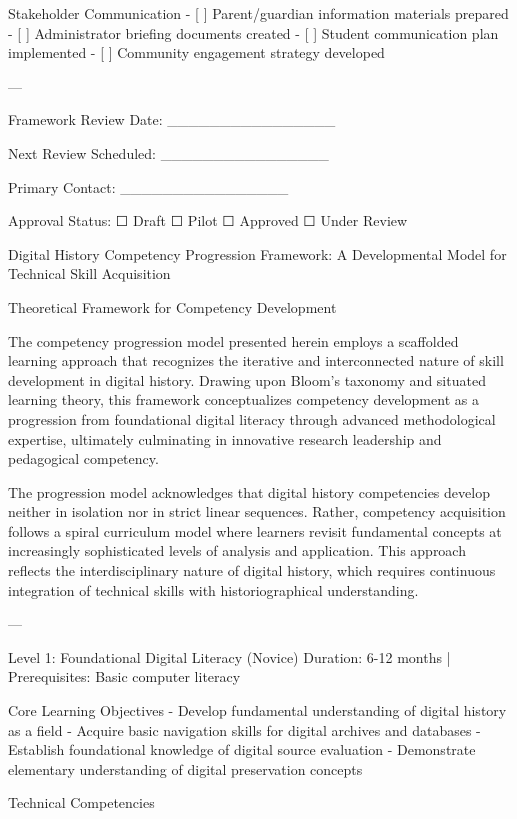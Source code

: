 \begin{appendices}
    Stakeholder Communication
- [ ] Parent/guardian information materials prepared
- [ ] Administrator briefing documents created
- [ ] Student communication plan implemented
- [ ] Community engagement strategy developed

---

 Framework Review Date:  ________________

 Next Review Scheduled:  ________________

 Primary Contact:  ________________

 Approval Status:  ☐ Draft ☐ Pilot ☐ Approved ☐ Under Review

\label{modl_tech_skill}

  Digital History Competency Progression Framework: A Developmental Model for Technical Skill Acquisition

   Theoretical Framework for Competency Development

The competency progression model presented herein employs a scaffolded learning approach that recognizes the iterative and interconnected nature of skill development in digital history. Drawing upon Bloom's taxonomy and situated learning theory, this framework conceptualizes competency development as a progression from foundational digital literacy through advanced methodological expertise, ultimately culminating in innovative research leadership and pedagogical competency.

The progression model acknowledges that digital history competencies develop neither in isolation nor in strict linear sequences. Rather, competency acquisition follows a spiral curriculum model where learners revisit fundamental concepts at increasingly sophisticated levels of analysis and application. This approach reflects the interdisciplinary nature of digital history, which requires continuous integration of technical skills with historiographical understanding.

---

   Level 1: Foundational Digital Literacy (Novice)
 Duration: 6-12 months | Prerequisites: Basic computer literacy 

    Core Learning Objectives
- Develop fundamental understanding of digital history as a field
- Acquire basic navigation skills for digital archives and databases
- Establish foundational knowledge of digital source evaluation
- Demonstrate elementary understanding of digital preservation concepts

    Technical Competencies


\end{appendices}
